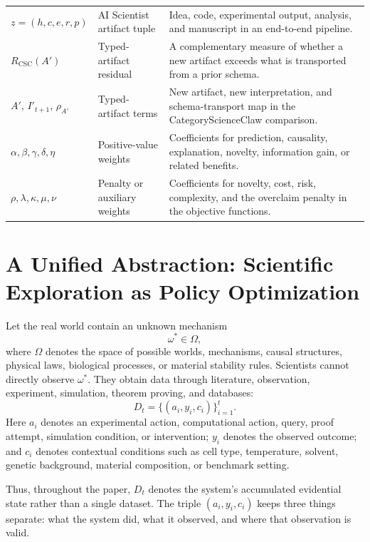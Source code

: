 \documentclass[11pt,a4paper]{article}
\begin{document}
{\begin{longtable}{@{}p{2.8cm}p{4.1cm}p{6.4cm}@{}}
$z=(h,c,e,r,p)$ & AI Scientist artifact tuple & Idea, code, experimental output, analysis, and manuscript in an end-to-end pipeline. \\
$R_{\mathrm{CSC}}(A')$ & Typed-artifact residual & A complementary measure of whether a new artifact exceeds what is transported from a prior schema. \\
$A'$, $I'_{t+1}$, $\rho_{A'}$ & Typed-artifact terms & New artifact, new interpretation, and schema-transport map in the CategoryScienceClaw comparison. \\
$\alpha,\beta,\gamma,\delta,\eta$ & Positive-value weights & Coefficients for prediction, causality, explanation, novelty, information gain, or related benefits. \\
$\rho,\lambda,\kappa,\mu,\nu$ & Penalty or auxiliary weights & Coefficients for novelty, cost, risk, complexity, and the overclaim penalty in the objective functions. \\
\end{longtable}
}

\section{A Unified Abstraction: Scientific Exploration as Policy Optimization}

Let the real world contain an unknown mechanism
\begin{equation}
  \omega^\ast \in \Omega,
\end{equation}
where $\Omega$ denotes the space of possible worlds, mechanisms, causal structures, physical laws, biological processes, or material stability rules. Scientists cannot directly observe $\omega^\ast$. They obtain data through literature, observation, experiment, simulation, theorem proving, and databases:
\begin{equation}
  D_t=\{(a_i,y_i,c_i)\}_{i=1}^{t}.
\end{equation}
Here $a_i$ denotes an experimental action, computational action, query, proof attempt, simulation condition, or intervention; $y_i$ denotes the observed outcome; and $c_i$ denotes contextual conditions such as cell type, temperature, solvent, genetic background, material composition, or benchmark setting.

Thus, throughout the paper, $D_t$ denotes the system's accumulated evidential state rather than a single dataset. The triple $(a_i,y_i,c_i)$ keeps three things separate: what the system did, what it observed, and where that observation is valid.
\end{document}
